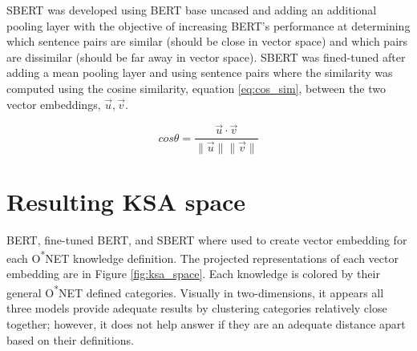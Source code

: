 \documentclass[12pt]{article}
\begin{document}
SBERT was developed using BERT base uncased and adding an additional pooling layer with the objective of increasing BERT's performance at determining which sentence pairs are similar (should be close in vector space) and which pairs are dissimilar (should be far away in vector space).\cite{sbert} SBERT was fined-tuned after adding a mean pooling layer and using sentence pairs where the similarity was computed using the cosine similarity, equation \ref{eq:cos_sim}, between the two vector embeddings, $\vec{u},\vec{v}$.\cite{sbert}

\begin{equation}
    cos\theta = \frac{\vec{u} \cdot \vec{v}}{\|\vec{u}\|\|\vec{v}\|}
    \label{eq:cos_sim}
\end{equation}

\section{Resulting KSA space}

BERT, fine-tuned BERT, and SBERT where used to create vector embedding for each O\textsuperscript{*}NET knowledge definition. The projected representations of each vector embedding are in Figure \ref{fig:ksa_space}. Each knowledge is colored by their general O\textsuperscript{*}NET defined categories. Visually in two-dimensions, it appears all three models provide adequate results by clustering categories relatively close together; however, it does not help answer if they are an adequate distance apart based on their definitions.
\end{document}

